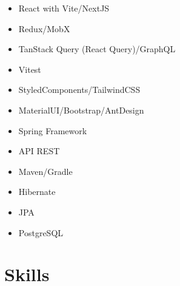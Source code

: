 \documentclass[11pt,a4paper,sans]{moderncv}
\begin{document}
\vspace{10pt}


\begin{multicols}{2}
\begin{itemize}
  \item React with Vite/NextJS
  \item Redux/MobX
  \item TanStack Query (React Query)/GraphQL
  \item Vitest
  \item StyledComponents/TailwindCSS
  \item MaterialUI/Bootstrap/AntDesign
  \item Spring Framework
  \item API REST
  \item Maven/Gradle
  \item Hibernate
  \item JPA
  \item PostgreSQL
\end{itemize}
\end{multicols}

\section{Skills}

\vspace{10pt}
\end{document}
